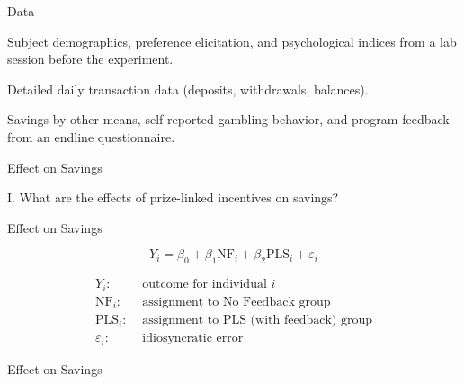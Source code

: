 \documentclass[aspectratio=169]{beamer}
\newenvironment{wideenumerate}{\enumerate\addtolength{\itemsep}{10pt}}{\endenumerate}
\begin{document}
\begin{frame}{Data}

	\begin{wideenumerate}
		\item Subject demographics, preference elicitation, and psychological indices from a lab session before the experiment.
		\item Detailed daily transaction data (deposits, withdrawals, balances).
		\item Savings by other means, self-reported gambling behavior, and program feedback from an endline questionnaire.
	\end{wideenumerate}

\end{frame}

\begin{frame}{Effect on Savings}
	
	\centering \large I. What are the effects of prize-linked incentives on savings?

\end{frame}

\begin{frame}{Effect on Savings}

	\begin{equation} \label{eq:teffect}
			Y_{i} = \beta_{0} + \beta_{1}\text{NF}_{i} + \beta_{2}\text{PLS}_{i} + \varepsilon_{i}
	\end{equation}

	\begin{align*}
	Y_{i}: & \text{~outcome for individual~} i \\
	\text{NF}_{i}: & \text{~assignment to No Feedback group} \\
	\text{PLS}_{i}: & \text{~assignment to PLS (with feedback) group} \\
	\varepsilon_i: & \text{~idiosyncratic error}
	\end{align*}
	

\end{frame}

\begin{frame}{Effect on Savings}

	


\end{frame}
\end{document}
